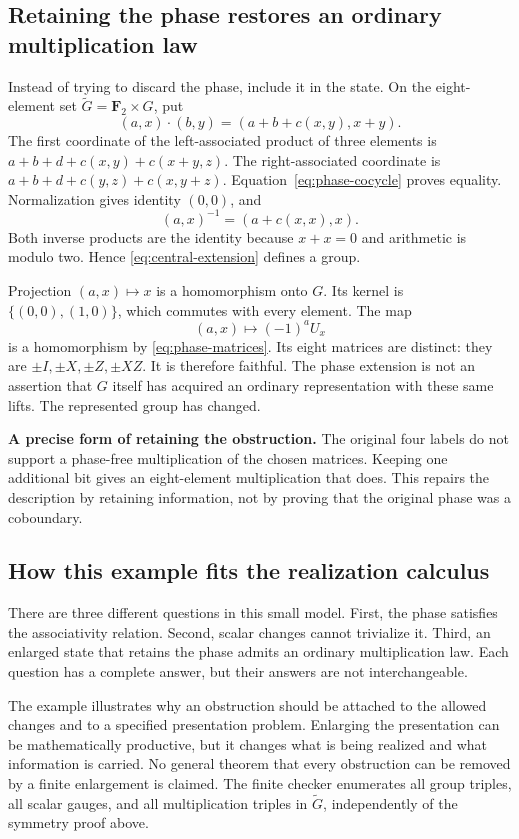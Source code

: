 \subsection{Retaining the phase restores an ordinary multiplication law}
Instead of trying to discard the phase, include it in the state. On the eight-element set \(\widetilde G=\mathbf F_2\times G\), put
\begin{equation}\label{eq:central-extension}
 (a,x)\cdot(b,y)=(a+b+c(x,y),x+y).
\end{equation}
The first coordinate of the left-associated product of three elements is
\(a+b+d+c(x,y)+c(x+y,z)\). The right-associated coordinate is
\(a+b+d+c(y,z)+c(x,y+z)\). Equation~\eqref{eq:phase-cocycle} proves equality. Normalization gives identity \((0,0)\), and
\[
 (a,x)^{-1}=(a+c(x,x),x).
\]
Both inverse products are the identity because \(x+x=0\) and arithmetic is modulo two. Hence \eqref{eq:central-extension} defines a group.

Projection \((a,x)\mapsto x\) is a homomorphism onto \(G\). Its kernel is \(\{(0,0),(1,0)\}\), which commutes with every element. The map
\[
 (a,x)\longmapsto(-1)^aU_x
\]
is a homomorphism by \eqref{eq:phase-matrices}. Its eight matrices are distinct: they are \(\pm I,\pm X,\pm Z,\pm XZ\). It is therefore faithful. The phase extension is not an assertion that \(G\) itself has acquired an ordinary representation with these same lifts. The represented group has changed.

\begin{insight}
\textbf{A precise form of retaining the obstruction.} The original four labels do not support a phase-free multiplication of the chosen matrices. Keeping one additional bit gives an eight-element multiplication that does. This repairs the description by retaining information, not by proving that the original phase was a coboundary.
\end{insight}

\subsection{How this example fits the realization calculus}
There are three different questions in this small model. First, the phase satisfies the associativity relation. Second, scalar changes cannot trivialize it. Third, an enlarged state that retains the phase admits an ordinary multiplication law. Each question has a complete answer, but their answers are not interchangeable.

The example illustrates why an obstruction should be attached to the allowed changes and to a specified presentation problem. Enlarging the presentation can be mathematically productive, but it changes what is being realized and what information is carried. No general theorem that every obstruction can be removed by a finite enlargement is claimed. The finite checker enumerates all group triples, all scalar gauges, and all multiplication triples in \(\widetilde G\), independently of the symmetry proof above.
